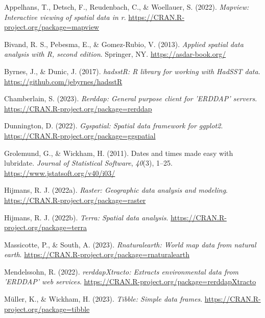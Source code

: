 \documentclass[
]{article}
\newlength{\cslhangindent}
\newlength{\cslentryspacingunit} %
\newenvironment{CSLReferences}[2] %
 {%
  \setlength{\parindent}{0pt}
  \ifodd #1
  \let\oldpar\par
  \def\par{\hangindent=\cslhangindent\oldpar}
  \fi
  \setlength{\parskip}{#2\cslentryspacingunit}
 }%
 {}
\begin{document}
\hypertarget{refs}{}
\begin{CSLReferences}{1}{0}
\leavevmode{}%
Appelhans, T., Detsch, F., Reudenbach, C., \& Woellauer, S. (2022).
\emph{Mapview: Interactive viewing of spatial data in r}.
\url{https://CRAN.R-project.org/package=mapview}

\leavevmode{}%
Bivand, R. S., Pebesma, E., \& Gomez-Rubio, V. (2013). \emph{Applied
spatial data analysis with {R}, second edition}. Springer, NY.
\url{https://asdar-book.org/}

\leavevmode{}%
Byrnes, J., \& Dunic, J. (2017). \emph{hadsstR: R library for working
with HadSST data}. \url{https://github.com/jebyrnes/hadsstR}

\leavevmode{}%
Chamberlain, S. (2023). \emph{Rerddap: General purpose client for
'ERDDAP' servers}. \url{https://CRAN.R-project.org/package=rerddap}

\leavevmode{}%
Dunnington, D. (2022). \emph{Ggspatial: Spatial data framework for
ggplot2}. \url{https://CRAN.R-project.org/package=ggspatial}

\leavevmode{}%
Grolemund, G., \& Wickham, H. (2011). Dates and times made easy with
{lubridate}. \emph{Journal of Statistical Software}, \emph{40}(3),
1--25. \url{https://www.jstatsoft.org/v40/i03/}

\leavevmode{}%
Hijmans, R. J. (2022a). \emph{Raster: Geographic data analysis and
modeling}. \url{https://CRAN.R-project.org/package=raster}

\leavevmode{}%
Hijmans, R. J. (2022b). \emph{Terra: Spatial data analysis}.
\url{https://CRAN.R-project.org/package=terra}

\leavevmode{}%
Massicotte, P., \& South, A. (2023). \emph{Rnaturalearth: World map data
from natural earth}.
\url{https://CRAN.R-project.org/package=rnaturalearth}

\leavevmode{}%
Mendelssohn, R. (2022). \emph{rerddapXtracto: Extracts environmental
data from 'ERDDAP' web services}.
\url{https://CRAN.R-project.org/package=rerddapXtracto}

\leavevmode{}%
Müller, K., \& Wickham, H. (2023). \emph{Tibble: Simple data frames}.
\url{https://CRAN.R-project.org/package=tibble}


\end{CSLReferences}
\end{document}
